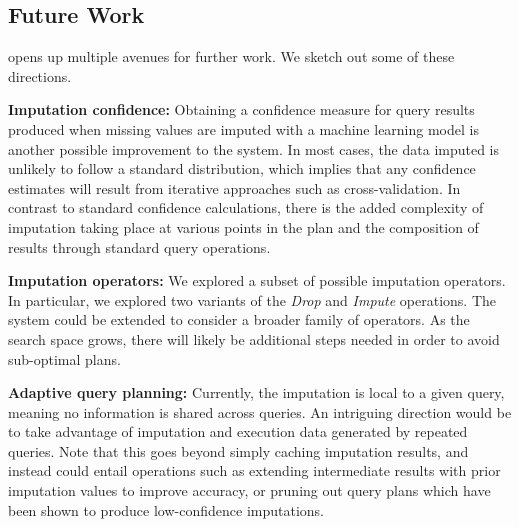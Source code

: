 \subsection{Future Work}
\ProjectName{} opens up multiple avenues for further work. We sketch out some of these
directions.

\textbf{Imputation confidence:} Obtaining a confidence measure for query results
produced when missing values are imputed with a machine learning model is
another possible improvement to the system. In most cases, the data imputed
is unlikely to follow a standard distribution, which implies that any confidence
estimates will result from iterative approaches such as cross-validation\cite{kohavi1995study}.
In contrast to standard confidence calculations, there is the added complexity
of imputation taking place at various points in the plan and the composition of results
through standard query operations.

\textbf{Imputation operators:} We explored a subset of possible imputation operators.
In particular, we explored two variants of the \textit{Drop} and \textit{Impute} operations. The system
could be extended to consider a broader family of operators. As the search space grows,
there will likely be additional steps needed in order to avoid sub-optimal plans.

\textbf{Adaptive query planning:} Currently, the imputation is local to a given query, meaning
no information is shared across queries. An intriguing direction would be to take advantage
of imputation and execution data generated by repeated queries. Note that this goes beyond
simply caching imputation results, and instead could entail operations such as extending
intermediate results with prior imputation values to improve accuracy, or pruning out
query plans which have been shown to produce low-confidence imputations.

